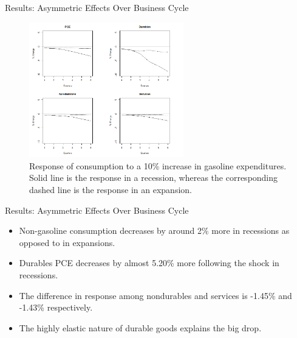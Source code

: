 \documentclass[
  10pt,
  ignorenonframetext,
]{beamer}
\begin{document}
\begin{frame}{Results: Asymmetric Effects Over Business Cycle}
\protect\hypertarget{results-asymmetric-effects-over-business-cycle}{}

\begin{figure}
\centering
\includegraphics[width=0.6\textwidth,height=\textheight]{Asymmetry - Aggregated.png}
\caption{Response of consumption to a 10\% increase in gasoline
expenditures. Solid line is the response in a recession, whereas the
corresponding dashed line is the response in an expansion.}
\end{figure}

\end{frame}

\begin{frame}{Results: Asymmetric Effects Over Business Cycle}
\protect\hypertarget{results-asymmetric-effects-over-business-cycle-1}{}

\begin{itemize}
\item
  Non-gasoline consumption decreases by around 2\% more in recessions as
  opposed to in expansions.
\item
  Durables PCE decreases by almost 5.20\% more following the shock in
  recessions.
\item
  The difference in response among nondurables and services is -1.45\%
  and -1.43\% respectively.
\item
  The highly elastic nature of durable goods explains the big drop.
\end{itemize}

\end{frame}
\end{document}
